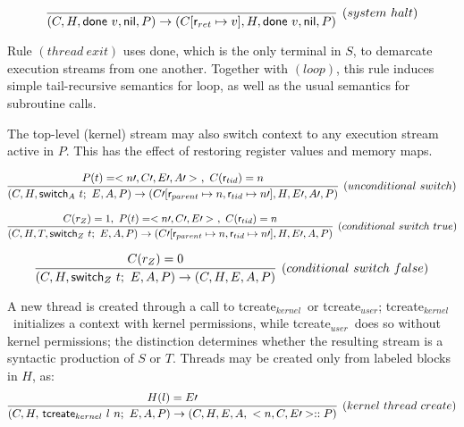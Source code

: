 \documentclass{article}
\newcommand{\sloop}[0]{\textsf{loop}}
\newcommand{\rtid}[0]{\textsf{r$_{tid}$}}
\newcommand{\rparent}[0]{\textsf{r$_{parent}$}}
\newcommand{\switcha}[0]{\textsf{switch}_{A}}
\newcommand{\switchz}[0]{\textsf{switch}_{Z}}
\newcommand{\kcreate}[0]{ \textsf{tcreate}$_{kernel}$}
\newcommand{\ucreate}[0]{  \textsf{tcreate}$_{user}$}
\begin{document}
    \begin{displaymath}
    \infer[(system \ halt)]
    {(C, H, \textsf{done} \ v, \textsf{nil}, P) \rightarrow (C[\textsf{r$_{ret}$} \mapsto v], H, \textsf{done} \ v, \textsf{nil}, P)}
    {}
\\ 
\end{displaymath}

Rule $(thread \ exit)$ uses \textsf{done}, which is the only terminal in $S$, to demarcate execution streams from one another.  Together with $(loop)$, this rule induces simple tail-recursive semantics for \sloop, as well as the usual semantics for subroutine calls.

The top-level (kernel) stream may also switch context to any execution stream active in $P$.    This has the effect of restoring register values and memory maps.

\begin{displaymath}
\infer[(unconditional \ switch)]
   {(C, H, \switcha \ t; \ E, A, P) \rightarrow (C\prime[\rparent \mapsto n, \rtid \mapsto n\prime], H, E\prime, A\prime, P)}
   {P(t) = <n\prime, C\prime, E\prime, A\prime> \ , \ C(\rtid) = n}
   \end{displaymath}
   
      \begin{displaymath}
\infer[(conditional \ switch \ true)]
   {(C, H, T, \switchz \ t; \ E, A, P) \rightarrow (C\prime[\rparent \mapsto n, \rtid \mapsto n\prime], H, E\prime, A, P)}
   {C(r_{Z}) = 1, \ P(t) = <n\prime, C\prime, E\prime> \ , \ C(\rtid) = n}
   \end{displaymath}
   
   \begin{displaymath}
\infer[(conditional \ switch \ false)]
   {(C, H, \switchz \ t; \ E, A, P) \rightarrow (C, H, E, A, P)}
   {C(r_{Z}) = 0}
   \end{displaymath}
   
   A new thread is created through a call to \kcreate \ or \ucreate; \kcreate \ initializes a context with kernel permissions, while \ucreate \ does so without kernel permissions; the distinction determines whether the resulting stream is a syntactic production of $S$ or $T$.  Threads may be created only from labeled blocks in $H$, as:\\
   
   \begin{displaymath}
\infer[(kernel \ thread \ create)]
   {(C, H, $\kcreate$ \ l \ n; \ E, A, P) \rightarrow (C, H, E, A, \ <n, C, E\prime>::P)}
   {H(l) = E\prime}
   \end{displaymath} 
   
\end{document}
